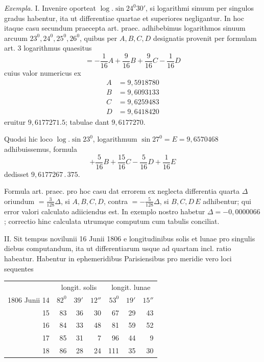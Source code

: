 \emph{Exempla.} I. Invenire oporteat \(\log.\sin 24^{0}30'\), si logarithmi sinuum per singulos gradus habentur, ita ut differentiae quartae et superiores negligantur. In
hoc itaque casu secundum praecepta art. praec. adhibebimus logarithmos sinuum
arcuum \(23^{0},24^{0},25^{0},26^{0}\), quibus per \(A,B,C,D\) designatis provenit per formulam art. 3 logarithmus quaesitus
\[
=-\frac{1}{16}A+\frac{9}{16}B+\frac{9}{16}C-\frac{1}{16}D
\]
cuius valor numericus ex
\[
\begin{aligned}
A&=9{,}5918780\\
B&=9{,}6093133\\
C&=9{,}6259483\\
D&=9{,}6418420
\end{aligned}
\]
eruitur \(9{,}6177271.5\); tabulae dant \(9{,}6177270\).

Quodsi hic loco \(\log.\sin 23^{0}\), logarithmum \(\sin 27^{0}=E=9{,}6570468\) adhibuissemus, formula
\[
+\frac{5}{16}B+\frac{15}{16}C-\frac{5}{16}D+\frac{1}{16}E
\]
dedisset \(9{,}6177267\,.\,375\).

Formula art. praec. pro hoc casu dat errorem ex neglecta differentia quarta
\(\Delta\) oriundum \(=\frac{3}{128}\Delta\), si \(A,B,C,D\), contra \(=-\frac{5}{128}\Delta\), si \(B,C,D\)\raisebox{-0.3ex}{:}\,\(E\) adhibentur; qui error valori calculato adiiciendus est. In exemplo nostro habetur
\(\Delta=-0{,}0000066\); correctio hinc calculata utrumque computum cum tabulis
conciliat.

II. Sit tempus novilunii 16 Junii 1806 e longitudinibus solis et lunae pro
singulis diebus computandum, ita ut differentiarum usque ad quartam incl. ratio
habeatur. Habentur in ephemeridibus Parisiensibus pro meridie vero loci sequentes

\begin{center}
\begin{tabular}{r@{\qquad}rrr@{\qquad}rrr}
&\multicolumn{3}{c}{longit. solis}&\multicolumn{3}{c}{longit. lunae}\\
1806 Junii 14&\(82^{0}\)&\(39'\)&\(12''\)&\(53^{0}\)&\(19'\)&\(15''\)\\
15&83&36&30&67&29&43\\
16&84&33&48&81&59&52\\
17&85&31&7&96&44&9\\
18&86&28&24&111&35&30
\end{tabular}
\end{center}

